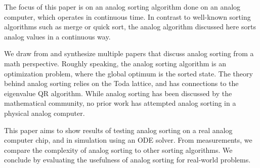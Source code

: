 The focus of this paper is on an analog sorting algorithm done on an analog computer, which operates in continuous time.
In contrast to well-known sorting algorithms such as merge or quick sort, 
the analog algorithm discussed here sorts analog values in a continuous way.

We draw from and synthesize multiple papers that discuss analog sorting from a math perspective.
Roughly speaking, the analog sorting algorithm is an optimization problem, where the global optimum is the sorted state.
The theory behind analog sorting relies on the Toda lattice, and has connections to the eigenvalue QR algorithm.
While analog sorting has been discussed by the mathematical community, no prior work has attempted analog sorting in a physical analog computer.

This paper aims to show results of testing analog sorting on a real analog computer chip, and in simulation using an ODE solver.
From measurements, we compare the complexity of analog sorting to other sorting algorithms.
We conclude by evaluating the usefulness of analog sorting for real-world problems.